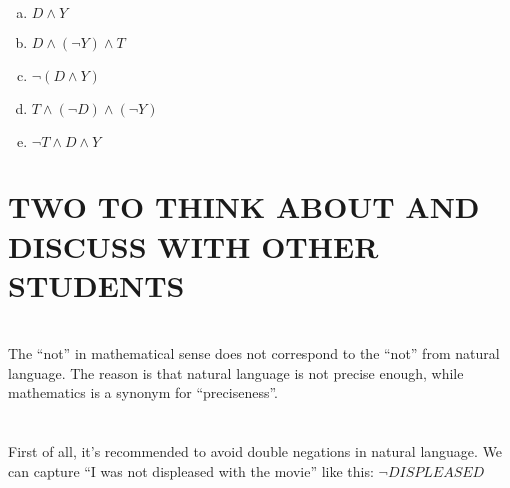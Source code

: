 \documentclass{article}
\begin{document}
\section{}

\begin{enumerate}[(a)]
\item $D \wedge Y$
\item $D \wedge (\neg Y) \wedge T$
\item $\neg(D \wedge Y)$
\item $T \wedge (\neg D) \wedge (\neg Y)$
\item $\neg T \wedge D \wedge Y$
\end{enumerate}

\section*{TWO TO THINK ABOUT AND DISCUSS WITH OTHER STUDENTS}
\setcounter{section}{0}

\section{}

The ``not'' in mathematical sense does not correspond to the ``not'' from natural
language. The reason is that natural language is not precise enough, while
mathematics is a synonym for ``preciseness''.

\section{}

First of all, it's recommended to avoid double negations in natural language.
We can capture ``I was not displeased with the movie'' like this: $\neg DISPLEASED$
\end{document}
